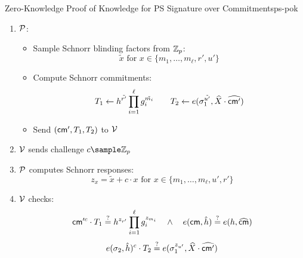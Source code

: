 {\begin{protocol}{Zero-Knowledge Proof of Knowledge for PS Signature over Commitments}{ps-pok}
    \begin{enumerate}
        \item $\mathcal{P}$:
        \begin{itemize}
            \item Sample Schnorr blinding factors from $\mathbb{Z}_p$:
            \[
                \tilde{x} \text{ for } x \in \{m_1,\ldots,m_\ell, r', u'\}
            \]
            \item Compute Schnorr commitments:
            \[
                T_1 \gets h^{\tilde{r'}} \prod_{i=1}^\ell g_i^{\tilde{m_i}} \qquad T_2 \gets e(\sigma_1^{\tilde{u'}}, \widehat{X} \cdot \widehat{\mathsf{cm}'})
            \]
            \item Send $(\mathsf{cm}', T_1, T_2)$ to $\mathcal{V}$
        \end{itemize}
        
        \item $\mathcal{V}$ sends challenge $c \sample \Z_p$
        
        \item $\mathcal{P}$ computes Schnorr responses:
        \[
            z_x = \tilde{x} + c \cdot x \text{ for } x \in \{m_1,\ldots,m_\ell, u', r'\}
        \]
        
        \item $\mathcal{V}$ checks:
        \[
            \mathsf{cm}'^c \cdot T_1 \stackrel{?}{=} h^{z_{r'}} \prod_{i=1}^\ell g_i^{z_{m_i}}
            \quad \wedge \quad e(\mathsf{cm}, \hat{h}) \stackrel{?}{=} e(h, \widehat{\mathsf{cm}})
        \]
        \[
            e(\sigma_2, \hat{h})^c \cdot T_2 \stackrel{?}{=} e(\sigma_1^{z_{u'}}, \widehat{X} \cdot \widehat{\mathsf{cm}'})
        \]
    \end{enumerate}
\end{protocol}




\newpage
}
